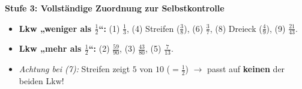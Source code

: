 \documentclass[a4paper,10pt]{article}
\newcommand{\mFrac}[2]{\frac{#1}{#2}}
\begin{document}
\begin{tcolorbox}[
    enhanced, colback=white, colframe=primaryBlue, arc=3mm, boxrule=1.2pt,
    left=4.5mm, right=4.5mm, top=2.5mm, bottom=2.5mm, height=12.9cm
]
    \begin{tcolorbox}[colback=step3Bg, colframe=step3Border, arc=2mm, boxrule=0.7pt, left=3mm, right=3mm, top=1.8mm, bottom=1.8mm]
        {\color{step3Text}\bfseries\faCheckCircle\enskip Stufe 3: Vollständige Zuordnung zur Selbstkontrolle}\\[0.8mm]
        {\small
        \begin{itemize}[leftmargin=4mm, itemsep=0.2pt, topsep=1pt]
            \item \textbf{Lkw „weniger als $\mFrac{1}{2}$“:} (1) $\mFrac{1}{3}$, (4) Streifen ($\mFrac{3}{8}$), (6) $\mFrac{3}{7}$, (8) Dreieck ($\mFrac{4}{9}$), (9) $\mFrac{21}{43}$.
            \item \textbf{Lkw „mehr als $\mFrac{1}{2}$“:} (2) $\mFrac{59}{90}$, (3) $\mFrac{43}{80}$, (5) $\mFrac{7}{13}$.
            \item \textit{Achtung bei (7):} Streifen zeigt $5$ von $10$ ($=\mFrac{1}{2}$) $\rightarrow$ passt auf \textbf{keinen} der beiden Lkw!
        \end{itemize}
        }
    \end{tcolorbox}
\end{tcolorbox}

\newpage

\end{document}

